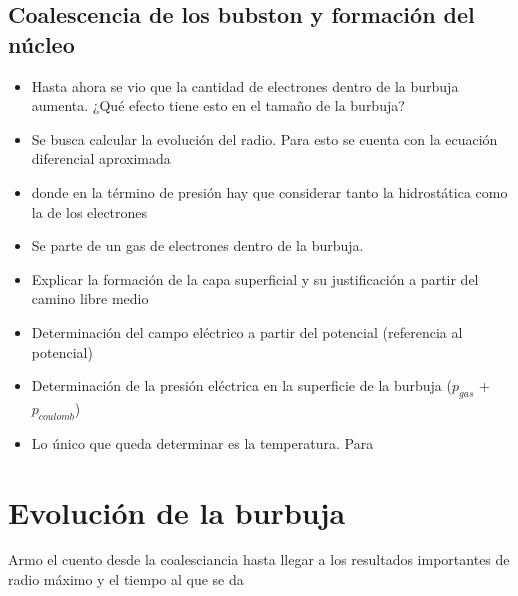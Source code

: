 \documentclass[aps,prb,twocolumn,superscriptaddress,floatfix,longbibliography,10pt]{revtex4-2}
\begin{document}
\subsection{Coalescencia de los bubston y formación del núcleo}

\begin{itemize}
  \item Hasta ahora se vio que la cantidad de electrones dentro de la burbuja aumenta. ¿Qué efecto tiene esto en el tamaño de la burbuja?
  \item Se busca calcular la evolución del radio. Para esto se cuenta con la ecuación diferencial aproximada
  \item donde en la término de presión hay que considerar tanto la hidrostática como la de los electrones
  \item Se parte de un gas de electrones dentro de la burbuja. 
  \item Explicar la formación de la capa superficial y su justificación a partir del camino libre medio
  \item Determinación del campo eléctrico a partir del potencial (referencia al potencial)
  \item Determinación de la presión eléctrica en la superficie de la burbuja ($p_{gas}$ + $p_{coulomb}$)
  \item Lo único que queda determinar es la temperatura. Para
\end{itemize}


\section{Evolución de la burbuja}

Armo el cuento desde la coalesciancia hasta llegar a los resultados importantes de radio máximo y el tiempo al que se da
\end{document}
